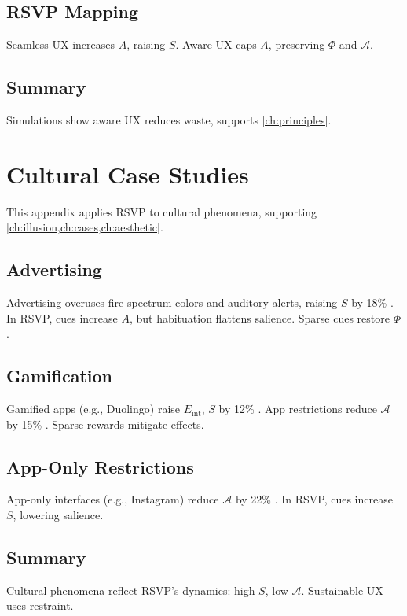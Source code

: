 \documentclass[openany]{book}
\newcommand{\PhiS}{\Phi} %
\newcommand{\Sent}{S} %
\newcommand{\Eint}{E_{\mathrm{int}}} %
\newcommand{\Auton}{\mathcal{A}} %
\begin{document}
{{{{{{{{{{{{\section{RSVP Mapping}
\label{sec:sim-rsvp}
Seamless UX increases \(A\), raising \(\Sent\). Aware UX caps \(A\), preserving \(\PhiS\) and \(\Auton\).

\section{Summary}
Simulations show aware UX reduces waste, supports \cref{ch:principles}.

\chapter{Cultural Case Studies}
\label{app:cultural}

This appendix applies RSVP to cultural phenomena, supporting \cref{ch:illusion,ch:cases,ch:aesthetic}.

\section{Advertising}
\label{sec:cultural-ads}
Advertising overuses fire-spectrum colors and auditory alerts, raising \(\Sent\) by 18\% \citep{colak2024}. In RSVP, cues increase \(A\), but habituation flattens salience. Sparse cues restore \(\PhiS\).

\section{Gamification}
\label{sec:cultural-gamification}
Gamified apps (e.g., Duolingo) raise \(\Eint\), \(\Sent\) by 12\% \citep{colak2024}. App restrictions reduce \(\Auton\) by 15\% \citep{doctorow2022}. Sparse rewards mitigate effects.

\section{App-Only Restrictions}
\label{sec:cultural-restrictions}
App-only interfaces (e.g., Instagram) reduce \(\Auton\) by 22\% \citep{doctorow2022}. In RSVP, cues increase \(\Sent\), lowering salience.

\section{Summary}
Cultural phenomena reflect RSVP’s dynamics: high \(\Sent\), low \(\Auton\). Sustainable UX uses restraint.

}}}}}}}}}}}}
\end{document}
